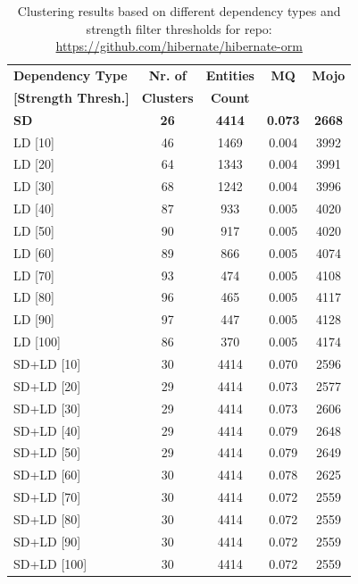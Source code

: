 \documentclass{ieeeaccess}
\begin{document}
\begin{table}
\caption{Clustering results based on different dependency types and strength filter thresholds for repo: \href{https://github.com/hibernate/hibernate-orm}{https://github.com/hibernate/hibernate-orm}}
\label{tab:clustering_results_hibernate}
\centering
\setlength{\tabcolsep}{3pt}
\begin{tabular}{|l|c|c|c|c|}
\hline
\textbf{Dependency Type} & \textbf{Nr. of} & \textbf{Entities} & \textbf{MQ} & \textbf{Mojo} \\
\textbf{[Strength Thresh.]} & \textbf{Clusters} & \textbf{Count} &  &  \\
\hline
\textbf{SD} & \textbf{26} & \textbf{4414} & \textbf{0.073} & \textbf{2668} \\
\hline
LD [10] & 46 & 1469 & 0.004 & 3992 \\
LD [20] & 64 & 1343 & 0.004 & 3991 \\
LD [30] & 68 & 1242 & 0.004 & 3996 \\
LD [40] & 87 & 933 & 0.005 & 4020 \\
LD [50] & 90 & 917 & 0.005 & 4020 \\
LD [60] & 89 & 866 & 0.005 & 4074 \\
LD [70] & 93 & 474 & 0.005 & 4108 \\
LD [80] & 96 & 465 & 0.005 & 4117 \\
LD [90] & 97 & 447 & 0.005 & 4128 \\
LD [100] & 86 & 370 & 0.005 & 4174 \\
\hline
SD+LD [10] & 30 & 4414 & 0.070 & 2596 \\
SD+LD [20] & 29 & 4414 & 0.073 & 2577 \\
SD+LD [30] & 29 & 4414 & 0.073 & 2606 \\
SD+LD [40] & 29 & 4414 & 0.079 & 2648 \\
SD+LD [50] & 29 & 4414 & 0.079 & 2649 \\
SD+LD [60] & 30 & 4414 & 0.078 & 2625 \\
SD+LD [70] & 30 & 4414 & 0.072 & 2559 \\
SD+LD [80] & 30 & 4414 & 0.072 & 2559 \\
SD+LD [90] & 30 & 4414 & 0.072 & 2559 \\
SD+LD [100] & 30 & 4414 & 0.072 & 2559 \\
\hline
\end{tabular}
\end{table}
\end{document}
